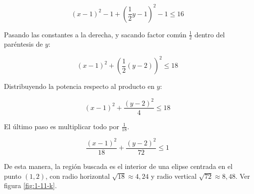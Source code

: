 \documentclass{article}
\begin{document}
\begin{enumerate}[(a)]
\begin{equation}
(x-1)^2 - 1 + \left( \frac{1}{2} y - 1 \right)^2 - 1 \leq 16
\end{equation}

Pasando las constantes a la derecha, y sacando factor común $\frac{1}{2}$ dentro del paréntesis de $y$:

\begin{equation}
(x-1)^2 + \left( \frac{1}{2} (y - 2) \right)^2 \leq 18
\end{equation}

Distribuyendo la potencia respecto al producto en $y$:

\begin{equation}
(x-1)^2 + \frac{(y-2)^2}{4} \leq 18
\end{equation}

El último paso es multiplicar todo por $\frac{1}{18}$.

\begin{equation}
\frac{(x-1)^2}{18} + \frac{(y-2)^2}{72} \leq 1
\end{equation}

De esta manera, la región buscada es el interior de una elipse centrada en el punto $(1, 2)$, con radio horizontal $\sqrt{18} \approx 4,24$ y radio vertical $\sqrt{72} \approx 8,48$. Ver figura \ref{fig:1-11-k}.


\end{enumerate}
\end{document}
